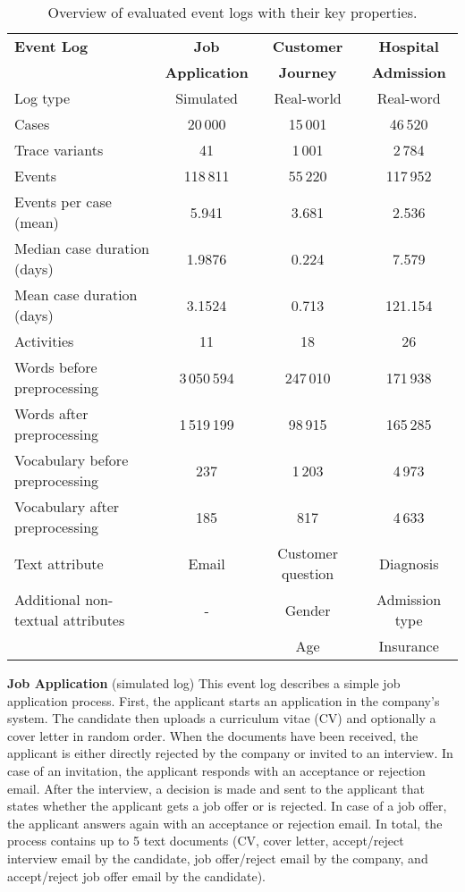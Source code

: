 \begin{table}[!htbp]
	\setlength\tabcolsep{5pt}
	\begin{tabularx}{\textwidth}{l c c c}
		\toprule
		\textbf{Event Log} & \textbf{Job} & \textbf{Customer} & \textbf{Hospital}  \\
		& \textbf{Application} & \textbf{Journey} &\textbf{Admission}  \\
		\midrule
		Log type & Simulated & Real-world & Real-word\\
		Cases & 20\,000& 15\,001& 46\,520\\
		Trace variants &41 & 1\,001 &2\,784 \\
		Events & 118\,811 & 55\,220 & 117\,952\\
		Events per case (mean) & 5.941& 3.681& 2.536\\
		Median case duration (days) & 1.9876 & 0.224& 7.579\\
		Mean case duration (days)& 3.1524 &  0.713 & 121.154\\
		Activities & 11 & 18 & 26\\
		Words before preprocessing & 3\,050\,594 &247\,010 &  171\,938\\
		Words after preprocessing  &1\,519\,199 &98\,915 & 165\,285\\
		Vocabulary before preprocessing & 237 & 1\,203 & 4\,973 \\
		Vocabulary after preprocessing & 185 & 817 & 4\,633\\
		Text attribute & Email& Customer question & Diagnosis\\
		Additional non-textual attributes & - & Gender& Admission type\\
		&  & Age& Insurance\\
		\bottomrule
	\end{tabularx}
	\caption[Overview of evaluated event logs]{Overview of evaluated event logs with their key properties.}
	\label{tab:logs}
\end{table}

\textbf{Job Application} (simulated log) This event log describes a simple job application process. 
First, the applicant starts an application in the company’s system.
The candidate then uploads a curriculum vitae (CV) and optionally a cover letter in random order.
When the documents have been received, the applicant is either directly rejected by the company or invited to an interview.
In case of an invitation, the applicant responds with an acceptance or rejection email.
After the interview, a decision is made and sent to the applicant that states whether the applicant gets a job offer or is rejected.
In case of a job offer, the applicant answers again with an acceptance or rejection email.
In total, the process contains up to 5 text documents (CV, cover letter, accept/reject interview email by the candidate, job offer/reject email by the company, and accept/reject job offer email by the candidate).

